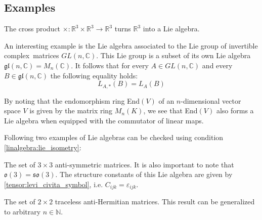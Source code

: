\subsection{Examples}
        \begin{example}
        	The cross product $\times:\mathbb{R}^3\times\mathbb{R}^3\rightarrow\mathbb{R}^3$ turns $\mathbb{R}^3$ into a Lie algebra.
        \end{example}
        \begin{example}
        	An interesting example is the Lie algebra associated to the Lie group of invertible complex\footnotemark\ matrices $GL(n, \mathbb{C})$. This Lie group is a subset of its own Lie algebra $\mathfrak{gl}(n, \mathbb{C}) = M_n(\mathbb{C})$. It follows that for every $A\in GL(n, \mathbb{C})$ and every $B\in\mathfrak{gl}(n, \mathbb{C})$ the following equality holds:
        	\begin{equation}
        		L_{A,\ast}(B) = L_A(B)
        	\end{equation}
        \end{example}
        \begin{result}
        	By noting that the endomorphism ring End$(V)$ of an $n$-dimensional vector space $V$ is given by the matrix ring $M_n(K)$, we see that End$(V)$ also forms a Lie algebra when equipped with the commutator of linear maps.
        \end{result}
        
        Following two examples of Lie algebras can be checked using condition \ref{linalgebra:lie_isometry}:
        \begin{example}
        	The set of $3\times3$ anti-symmetric matrices. It is also important to note that $\mathfrak{o}(3) = \mathfrak{so}(3)$. The structure constants of this Lie algebra are given by \ref{tensor:levi_civita_symbol}, i.e. $C_{ijk} = \varepsilon_{ijk}$.
        \end{example}
        \begin{example}
        	The set of $2\times2$ traceless anti-Hermitian matrices. This result can be generalized to arbitrary $n\in\mathbb{N}$.
        \end{example}
        
